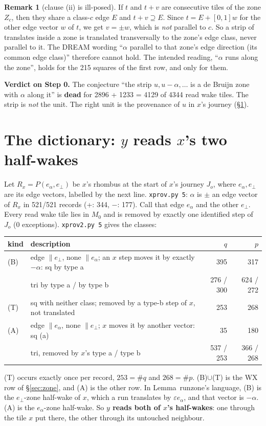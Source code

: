 \documentclass[11pt]{article}
\theoremstyle{definition}\newtheorem{definition}[theorem]{Definition}\newtheorem{remark}[theorem]{Remark}
\begin{document}
\begin{remark}[clause (ii) is ill-posed]\label{rem:ii}
If $t$ and $t+v$ are consecutive tiles of the zone $Z_c$, then they share a class-$c$ edge $E$ and $t+v\supseteq E$. Since $t=E+[0,1]w$ for the other edge vector $w$ of $t$, we get $v=\pm w$, which is \emph{not} parallel to $c$.
So a strip of translates inside a zone is translated transversally to the zone's edge class, never parallel to it. The DREAM wording ``$\alpha$ parallel to that zone's edge direction (its common edge class)'' therefore cannot hold.
The intended reading, ``$\alpha$ runs along the zone'', holds for the 215 squares of the first row, and only for them.
\end{remark}

\noindent\textbf{Verdict on Step 0.} The conjecture ``the strip $u,u-\alpha,\dots$ is a de Bruijn zone with $\alpha$ along it'' is \textbf{dead} for 2896 + 1233 = 4129 of 4344 read wake tiles. The strip is \emph{not} the unit. The right unit is the provenance of $u$ in $x$'s journey (\S\ref{sec:dict}).

\section{The dictionary: $y$ reads $x$'s two half-wakes}\label{sec:dict}
Let $R_x=P(e_\alpha,e_\perp)$ be $x$'s rhombus at the start of $x$'s journey $J_o$, where $e_\alpha,e_\perp$ are its edge vectors, labelled by the next line.
\texttt{xprov.py 5}: $\alpha$ is $\pm$ an edge vector of $R_x$ in 521/521 records (+: 344, $-$: 177). Call that edge $e_\alpha$ and the other $e_\perp$. Every read wake tile lies in $M_0$ and is removed by exactly one identified step of $J_o$ (0 exceptions).
\texttt{xprov2.py 5} gives the classes:
\begin{center}\begin{tabular}{llrr}\toprule
kind & description & $q$ & $p$\\\midrule
(B) & edge $\parallel e_\perp$, none $\parallel e_\alpha$; an $x$ step moves it by exactly $-\alpha$: sq by type a & 395 & 317\\
& \phantom{(B)} tri by type a / by type b & 276 / 300 & 624 / 272\\
(T) & sq with neither class; removed by a type-b step of $x$, not translated & 253 & 268\\
(A) & edge $\parallel e_\alpha$, none $\parallel e_\perp$; $x$ moves it by another vector: sq (a) & 35 & 180\\
& \phantom{(A)} tri, removed by $x$'s type a / type b & 537 / 253 & 366 / 268\\\bottomrule
\end{tabular}\end{center}
(T) occurs exactly once per record, $253=\#q$ and $268=\#p$. (B)$\cup$(T) is the WX row of \S\ref{sec:zone}, and (A) is the other row.
In Lemma~runzone's language, (B) is the $e_\perp$-zone half-wake of $x$, which a run translates by $\varepsilon e_\alpha$, and that vector is $-\alpha$. (A) is the $e_\alpha$-zone half-wake. So \textbf{$y$ reads both of $x$'s half-wakes}: one through the tile $x$ put there, the other through its untouched neighbour.
\end{document}
